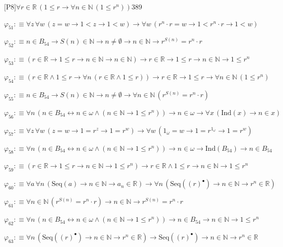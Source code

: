 \begin{fullproof}{[P8]}{$\forall r \in \mathbb{R}\,(1 \leq r \to \forall n \in \mathbb{N}\,(1 \leq {{r}^{n}}))$}{389}
\begin{abbrevlist}
\item $\varphi_{51} :\equiv \forall z\,\forall w\,(z = w \to 1 < z \to 1 < w) \to \forall w\,({{r}^{n}} \cdot r = w \to 1 < {{r}^{n}} \cdot r \to 1 < w)$
\item $\varphi_{52} :\equiv n \in B_{54} \to S(n) \in \mathbb{N} \to n \neq \emptyset \to n \in \mathbb{N} \to {{r}^{S(n)}} = {{r}^{n}} \cdot r$
\item $\varphi_{53} :\equiv (r \in \mathbb{R} \to 1 \leq r \to n \in \mathbb{N} \to n \in \mathbb{N}) \to r \in \mathbb{R} \to 1 \leq r \to n \in \mathbb{N} \to 1 \leq {{r}^{n}}$
\item $\varphi_{54} :\equiv (r \in \mathbb{R} \land 1 \leq r \to \forall n\,(r \in \mathbb{R} \land 1 \leq r)) \to r \in \mathbb{R} \to 1 \leq r \to \forall n \in \mathbb{N}\,(1 \leq {{r}^{n}})$
\item $\varphi_{55} :\equiv n \in B_{54} \to S(n) \in \mathbb{N} \to n \neq \emptyset \to \forall n \in \mathbb{N}\,({{r}^{S(n)}} = {{r}^{n}} \cdot r)$
\item $\varphi_{56} :\equiv \forall n\,(n \in B_{54} \leftrightarrow n \in \omega \land (n \in \mathbb{N} \to 1 \leq {{r}^{n}})) \to n \in \omega \to \forall x\,(\mathrm{Ind}(x) \to n \in x)$
\item $\varphi_{57} :\equiv \forall z\,\forall w\,(z = w \to 1 = {{r}^{z}} \to 1 = {{r}^{w}}) \to \forall w\,(1_{\omega} = w \to 1 = {{r}^{1_{\omega}}} \to 1 = {{r}^{w}})$
\item $\varphi_{58} :\equiv \forall n\,(n \in B_{54} \leftrightarrow n \in \omega \land (n \in \mathbb{N} \to 1 \leq {{r}^{n}})) \to n \in \omega \to \mathrm{Ind}(B_{54}) \to n \in B_{54}$
\item $\varphi_{59} :\equiv (r \in \mathbb{R} \to 1 \leq r \to n \in \mathbb{N} \to 1 \leq {{r}^{n}}) \to r \in \mathbb{R} \land 1 \leq r \to n \in \mathbb{N} \to 1 \leq {{r}^{n}}$
\item $\varphi_{60} :\equiv \forall a\,\forall n\,(\mathrm{Seq}(a) \to n \in \mathbb{N} \to a_{n} \in \mathbb{R}) \to \forall n\,(\mathrm{Seq}({(r)^{\bullet}}) \to n \in \mathbb{N} \to {{r}^{n}} \in \mathbb{R})$
\item $\varphi_{61} :\equiv \forall n \in \mathbb{N}\,({{r}^{S(n)}} = {{r}^{n}} \cdot r) \to n \in \mathbb{N} \to {{r}^{S(n)}} = {{r}^{n}} \cdot r$
\item $\varphi_{62} :\equiv \forall n\,(n \in B_{54} \leftrightarrow n \in \omega \land (n \in \mathbb{N} \to 1 \leq {{r}^{n}})) \to n \in B_{54} \to n \in \mathbb{N} \to 1 \leq {{r}^{n}}$
\item $\varphi_{63} :\equiv \forall n\,(\mathrm{Seq}({(r)^{\bullet}}) \to n \in \mathbb{N} \to {{r}^{n}} \in \mathbb{R}) \to \mathrm{Seq}({(r)^{\bullet}}) \to n \in \mathbb{N} \to {{r}^{n}} \in \mathbb{R}$

\end{abbrevlist}
\end{fullproof}
